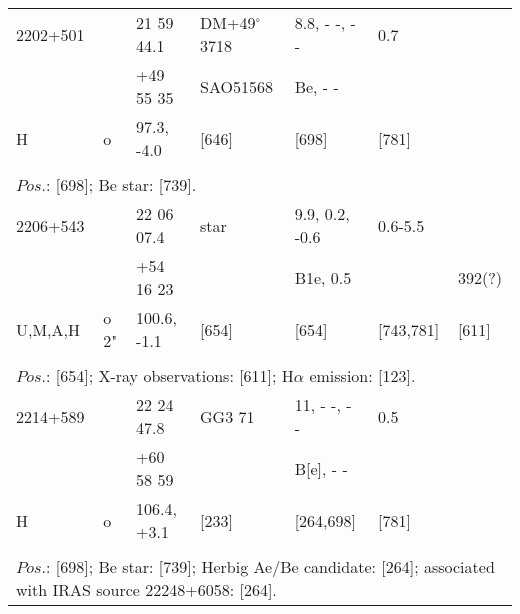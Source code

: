 \documentclass{aa}
\begin{document}
\begin{table*}[h]
\begin{tabular}{p{2.5cm}p{1cm}p{1.8cm}p{2.3cm}p{3.3cm}p{2.0cm}p{2.2cm}}
\noalign{\smallskip}
\hline
\noalign{\smallskip}
2202+501      &            & 21 59 44.1      &  DM+49$^\circ$3718  &  8.8, - -, - -       & 0.7            &          \\
                        &            & +49 55 35       &  SAO51568                  &  Be, - -            &                   &          \\
H                     & o         & 97.3, -4.0        &        [646]                     &  [698]           & [781]       &           \\
\\
\multicolumn{7}{p{17.5cm}}{
$Pos$.: [698]; Be star: [739].}\\

\noalign{\smallskip}
\hline
\noalign{\smallskip}
 2206+543     &               & 22 06 07.4      &  star                 &  9.9, 0.2, -0.6      & 0.6-5.5               &                        \\
                        &               & +54 16 23       &                           &  B1e, 0.5             &                            &   392(?)          \\
U,M,A,H         & o 2"      & 100.6, -1.1      &       [654]        &  [654]                 & [743,781]      &  [611]         \\
\\
\multicolumn{7}{p{17.5cm}}{
$Pos$.: [654]; X-ray observations: [611]; H$\alpha$ emission: [123].}\\

\noalign{\smallskip}
\hline
\noalign{\smallskip}
 2214+589     &             & 22 24 47.8      & GG3 71                 &  11, - -,  - -       & 0.5             &          \\
                        &             & +60 58 59       &                                &  B[e], - -             &                   &          \\
H                     & o          & 106.4, +3.1     &       [233]             &  [264,698]         & [781]       &           \\
\\
\multicolumn{7}{p{17.5cm}}{
$Pos$.: [698]; Be star: [739]; Herbig Ae/Be candidate: [264]; associated with IRAS source 22248+6058: [264]. }\\


\end{tabular}
\end{table*}
\end{document}

